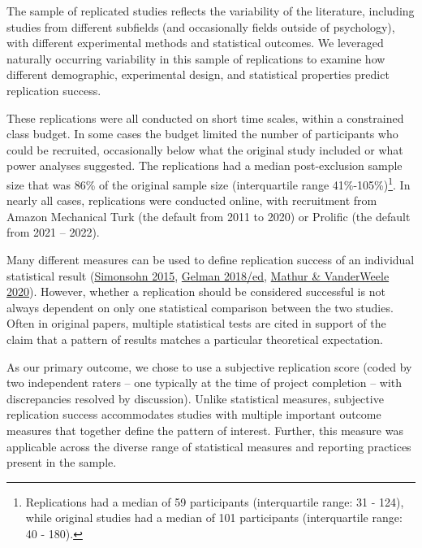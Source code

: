 \documentclass[
  english,
  a4paper,
]{article}
\begin{document}
The sample of replicated studies reflects the variability of the literature, including studies from different subfields (and occasionally fields outside of psychology), with different experimental methods and statistical outcomes. We leveraged naturally occurring variability in this sample of replications to examine how different demographic, experimental design, and statistical properties predict replication success.

These replications were all conducted on short time scales, within a constrained class budget. In some cases the budget limited the number of participants who could be recruited, occasionally below what the original study included or what power analyses suggested. The replications had a median post-exclusion sample size that was 86\% of the original sample size (interquartile range 41\%-105\%)\footnote{Replications had a median of 59 participants (interquartile range: 31 - 124), while original studies had a median of 101 participants (interquartile range: 40 - 180).}. In nearly all cases, replications were conducted online, with recruitment from Amazon Mechanical Turk (the default from 2011 to 2020) or Prolific (the default from 2021 -- 2022).

Many different measures can be used to define replication success of an individual statistical result (\protect\hyperlink{ref-simonsohn2015}{Simonsohn 2015}, \protect\hyperlink{ref-gelman2018}{Gelman 2018/ed}, \protect\hyperlink{ref-mathur2020}{Mathur \& VanderWeele 2020}). However, whether a replication should be considered successful is not always dependent on only one statistical comparison between the two studies. Often in original papers, multiple statistical tests are cited in support of the claim that a pattern of results matches a particular theoretical expectation.

As our primary outcome, we chose to use a subjective replication score (coded by two independent raters -- one typically at the time of project completion -- with discrepancies resolved by discussion). Unlike statistical measures, subjective replication success accommodates studies with multiple important outcome measures that together define the pattern of interest. Further, this measure was applicable across the diverse range of statistical measures and reporting practices present in the sample.
\end{document}

